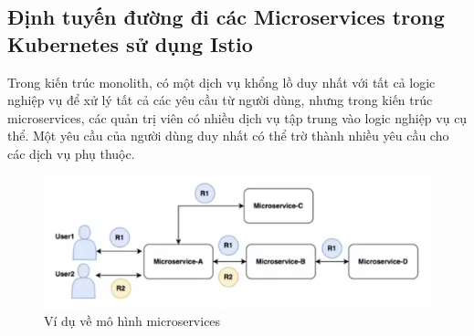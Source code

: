 \documentclass[12pt,a4paper]{report}
\begin{document}
		\subsection{Định tuyến đường đi các Microservices trong Kubernetes sử dụng Istio}
			\hspace{0.6cm} Trong kiến trúc monolith, có một dịch vụ khổng lồ duy nhất với tất cả logic nghiệp vụ để xử lý tất cả các yêu cầu từ người dùng, nhưng trong kiến trúc microservices, các quản trị viên có nhiều dịch vụ tập trung vào logic nghiệp vụ cụ thể. Một yêu cầu của người dùng duy nhất có thể trờ thành nhiều yêu cầu cho các dịch vụ phụ thuộc.
			
			\begin{figure}[h!]
				\centering
				\includegraphics[width=0.9\linewidth]{Pics/2.2.2-p4}
				\caption{Ví dụ về mô hình microservices}
				\label{fig:2}
			\end{figure}
		
\end{document}

